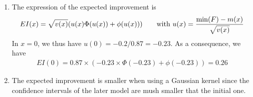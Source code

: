 \documentclass[a4paper,10pt]{article}
\begin{document}
\begin{enumerate}[label=Q\arabic*.]
\item The expression of the expected improvement is
\begin{align*}
	EI(x) = \sqrt{v(x)} (u(x) \Phi(u(x)) + \phi(u(x)))  \text{\qquad with } u(x) = \frac{\min(F) - m(x)}{\sqrt{v(x)}}
\end{align*}
In $x=0$, we thus have $u(0)= -0.2/0.87 = -0.23$. As a consequence, we have
\begin{align*}
	EI(0) = 0.87 \times (-0.23 \times \Phi(-0.23) + \phi(-0.23)) = 0.26
\end{align*}

\item The expected improvement is smaller when using a Gaussian kernel since the confidence intervals of the later model are mush smaller that the initial one.
  \end{enumerate}
\end{document}
